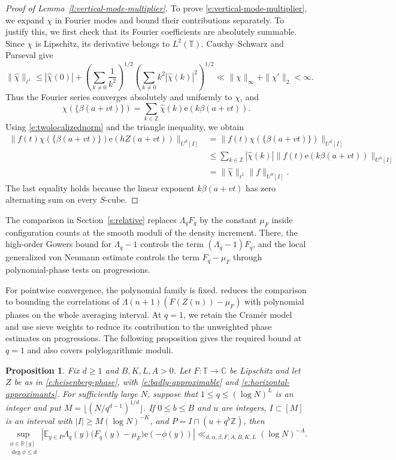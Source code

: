 \documentclass[12pt]{amsart}
\newcommand{\1}{\mathbf 1}
\newcommand{\e}{\mathrm e}
\newtheorem{proposition}[theorem]{Proposition}
\theoremstyle{definition}
\begin{document}
\begin{proof}[Proof of Lemma~\ref{l:vertical-mode-multiplier}]
To prove \eqref{e:vertical-mode-multiplier}, we expand \(\chi\)
in Fourier modes and bound their contributions separately. To
justify this, we first check that its Fourier coefficients are
absolutely summable. Since \(\chi\) is Lipschitz, its derivative
belongs to \(L^2(\mathbb T)\). Cauchy--Schwarz and Parseval give
\[
 \|\widehat\chi\|_{\ell^1}
 \leq |\widehat\chi(0)|
 +\left(\sum_{k\ne0}\frac1{k^2}\right)^{1/2}
  \left(\sum_{k\ne0}k^2|\widehat\chi(k)|^2\right)^{1/2}
 \ll \|\chi\|_\infty+\|\chi'\|_2<\infty.
\]
Thus the Fourier series converges absolutely and uniformly to
\(\chi\), and
\[
 \chi(\{\beta(a+vt)\})
 =\sum_{k\in\mathbb Z}\widehat\chi(k)\e(k\beta(a+vt)).
\]
Using \eqref{e:twolocalizednorm} and the triangle inequality, we obtain
\[
\begin{aligned}
 \|f(t)\chi(\{\beta(a+vt)\})\e(hZ(a+vt))\|_{U^S[I]}
 &=\|f(t)\chi(\{\beta(a+vt)\})\|_{U^S[I]}\\
 &\leq\sum_{k\in\mathbb Z}|\widehat\chi(k)|
       \|f(t)\e(k\beta(a+vt))\|_{U^S[I]}\\
 &=\|\widehat\chi\|_{\ell^1}\|f\|_{U^S[I]}.
\end{aligned}
\]
The last equality holds because the linear exponent
\(k\beta(a+vt)\) has zero alternating sum on every \(S\)-cube.
\end{proof}


The comparison in Section~\ref{s:relative} replaces
$\Lambda_qF_q$ by the constant $\mu_F$ inside configuration counts
at the smooth moduli of the density increment. There, the high-order
Gowers bound for $\Lambda_q-1$ controls the term $(\Lambda_q-1)F_q$,
and the local generalized von Neumann estimate controls the term
$F_q-\mu_F$ through polynomial-phase tests on progressions.

For pointwise convergence, the polynomial family is fixed.
\cite[Theorem~4.1]{Teravainen} reduces the comparison to bounding
the correlations of $\Lambda(n+1)(F(Z(n))-\mu_F)$ with polynomial
phases on the whole averaging interval. At $q=1$, we retain the
Cram\'er model and use sieve weights to reduce its contribution to
the unweighted phase estimates on progressions. The following
proposition gives the required bound at $q=1$ and also covers
polylogarithmic moduli.

\begin{proposition}
\label{p:prime-phase}
Fix $d\geq1$ and $B,K,L,A>0$. Let $F:\mathbb T\to\mathbb C$
be Lipschitz and let $Z$ be as in \eqref{e:heisenberg-phase}, with
\eqref{e:badly-approximable} and \eqref{e:horizontal-approximants}.
For sufficiently large $N$, suppose that $1\leq q\leq(\log N)^L$
is an integer and put $M=\lfloor(N/q^{d-1})^{1/d}\rfloor$.
If $0\leq b\leq B$ and $u$ are integers, $I\subset[M]$ is an interval
with $|I|\geq M(\log N)^{-K}$, and $P=I\cap(u+q^b\mathbb Z)$, then
\begin{equation}\label{e:prime-local-phase}
 \sup_{\substack{\phi\in\mathbb R[y]\\\deg\phi\leq d}}
 \left|\mathbb E_{y\in P}\Lambda_q(y)
       \bigl(F_q(y)-\mu_F\bigr)\e(-\phi(y))\right|
 \ll_{d,\alpha,\beta,F,A,B,K,L}(\log N)^{-A}.
\end{equation}
\end{proposition}
\end{document}
